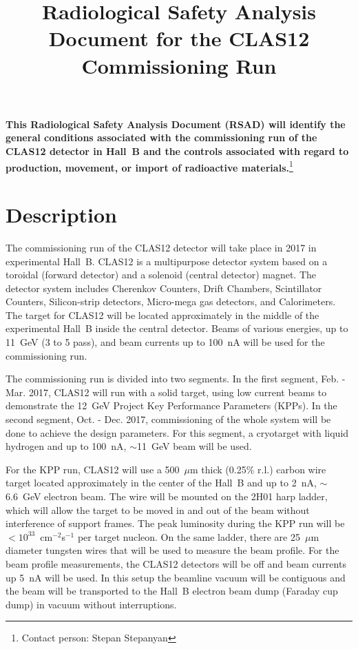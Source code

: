 \documentclass [12pt]{article}
\title{Radiological Safety Analysis Document for the CLAS12 Commissioning Run}
\begin{document}
\date{}
\vskip 0.5cm
\maketitle

\noindent

{\bf This Radiological Safety Analysis Document (RSAD) will identify the
general conditions associated with the commissioning run of the CLAS12 
detector in Hall~B and the controls associated with regard to production, 
movement, or import of radioactive materials.}\footnote{Contact person: Stepan Stepanyan}

\section{Description}
\indent

The commissioning run of the CLAS12 detector will take place in 2017 in experimental 
Hall~B. CLAS12 is a multipurpose detector system based on a toroidal (forward detector) 
and a solenoid (central detector) magnet. The detector system includes Cherenkov Counters, 
Drift Chambers, Scintillator Counters, Silicon-strip detectors, Micro-mega gas detectors, 
and Calorimeters. The target for CLAS12 will be located approximately in the middle of the 
experimental Hall~B inside the central detector. Beams of various energies, up to 11~GeV 
(3 to 5 pass), and beam currents up to 100~nA will be used for the commissioning run.
    
The commissioning run is divided into two segments. In the first segment, Feb. - Mar. 2017, 
CLAS12 will run with a solid target, using low current beams to demonstrate the 12~GeV
Project Key Performance Parameters (KPPs). In the second segment, Oct. - Dec. 2017, 
commissioning of the whole system will be done to achieve the design parameters. For this 
segment, a cryotarget with liquid hydrogen and up to 100~nA, $\sim$11~GeV beam will be used. 

For the KPP run, CLAS12 will use a 500~$\mu$m thick (0.25\% r.l.) carbon wire target located 
approximately in the center of the Hall~B and up to 2~nA, $\sim$6.6~GeV electron beam. The wire 
will be mounted on the 2H01 harp ladder, which will allow the target to be moved in and 
out of the beam without interference of support frames. The peak luminosity during the KPP run 
will be $<10^{33}$~cm$^{-2}$s$^{-1}$ per target nucleon. On the same ladder, there are 25~$\mu$m 
diameter tungsten wires that will be used to measure the beam profile. For the beam profile 
measurements, the CLAS12 detectors will be off and beam currents up 5~nA will be used. In this 
setup the beamline vacuum will be contiguous and the beam will be transported to the Hall~B 
electron beam dump (Faraday cup dump) in vacuum without interruptions. 
\end{document}
